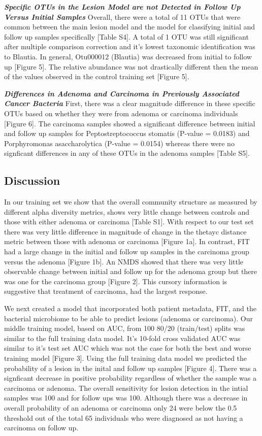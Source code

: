 \documentclass[12pt,]{article}
\begin{document}
\textbf{\emph{Specific OTUs in the Lesion Model are not Detected in
Follow Up Versus Initial Samples}} Overall, there were a total of 11
OTUs that were common between the main lesion model and the model for
classifying initial and follow up samples specifically {[}Table S4{]}. A
total of 1 OTU was still significant after multiple comparison
correction and it's lowest taxonomic identification was to Blautia. In
general, Otu000012 (Blautia) was decreased from initial to follow up
{[}Figure 5{]}. The relative abundance was not drastically different
then the mean of the values observed in the control training set
{[}Figure 5{]}.

\textbf{\emph{Differences in Adenoma and Carcinoma in Previously
Associated Cancer Bacteria}} First, there was a clear magnitude
difference in these specific OTUs based on whether they were from
adenoma or carcinoma individuals {[}Figure 6{]}. The carcinoma samples
showed a significant difference between initial and follow up samples
for Peptostreptococcus stomatis (P-value = 0.0183) and Porphyromonas
asaccharolytica (P-value = 0.0154) whereas there were no signficant
differences in any of these OTUs in the adenoma samples {[}Table S5{]}.

\newpage

\subsection{Discussion}\label{discussion}

In our training set we show that the overall community structure as
measured by different alpha diversity metrics, shows very little change
between controls and those with either adenoma or carcinoma {[}Table
S1{]}. With respect to our test set there was very little difference in
magnitude of change in the thetayc distance metric between those with
adenoma or carcinoma {[}Figure 1a{]}. In contrast, FIT had a large
change in the initial and follow up samples in the carcinoma group
versus the adenoma {[}Figure 1b{]}. An NMDS showed that there was very
little observable change between initial and follow up for the adenoma
group but there was one for the carcinoma group {[}Figure 2{]}. This
cursory information is suggestive that treatment of carcinoma, had the
largest response.

We next created a model that incorporated both patient metadata, FIT,
and the bacterial microbiome to be able to predict lesions (adenoma or
carcinoma). Our middle training model, based on AUC, from 100 80/20
(train/test) splits was similar to the full training data model. It's
10-fold cross validated AUC was similar to it's test set AUC which was
not the case for both the best and worse training model {[}Figure 3{]}.
Using the full training data model we predicted the probability of a
lesion in the inital and follow up samples {[}Figure 4{]}. There was a
signficant decrease in positive probability regardless of whether the
sample was a carcinoma or adenoma. The overall sensitivity for lesion
detection in the intial samples was 100 and for follow ups was 100.
Although there was a decrease in overall probability of an adenoma or
carcinoma only 24 were below the 0.5 threshold out of the total 65
individuals who were diagnosed as not having a carcinoma on follow up.
\end{document}
